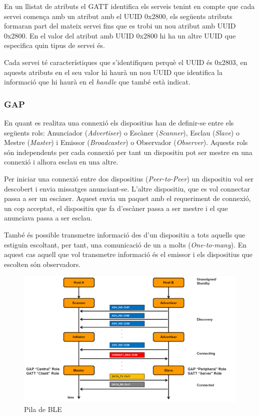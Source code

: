 En un llistat de atributs el GATT identifica els serveis tenint en compte que cada servei comença amb un atribut amb el UUID 0x2800, els següents atributs formaran part del mateix servei fins que es trobi un nou atribut amb UUID 0x2800. En el valor del atribut amb UUID 0x2800 hi ha un altre UUID que especifica quin tipus de servei és.

Cada servei té característiques que s'identifiquen perquè el UUID és 0x2803, en aquests atributs en el seu valor hi haurà un nou UUID que identifica la informació que hi haurà en el \textit{handle} que també està indicat.


\subsubsection{GAP}
En quant es realitza una connexió els dispositius han de definir-se entre els següents rols: Anunciador (\textit{Advertiser}) o Escàner (\textit{Scanner}), Esclau (\textit{Slave}) o Mestre (\textit{Master}) i Emissor (\textit{Broadcaster}) o Observador (\textit{Observer}).
Aquests rols són independents per cada connexió per tant un dispositiu pot ser mestre en una connexió i alhora esclau en una altre.

Per iniciar una connexió entre dos dispositius (\textit{Peer-to-Peer}) un dispositiu vol ser descobert i envia missatges anunciant-se. L'altre dispositiu, que es vol connectar passa a ser un escàner. Aquest envia un paquet amb el requeriment de connexió, un cop acceptat, el dispositiu que fa d'escàner passa a ser mestre i el que anunciava passa a ser esclau.

També és possible transmetre informació des d'un dispositiu a tots aquells que estiguin escoltant, per tant, una comunicació de un a molts (\textit{One-to-many}). En aquest cas aquell que vol transmetre informació és el emissor i els dispositius que escolten són observadors.

\begin{figure}[h]
	\begin{center}
		\includegraphics[width=1\textwidth]{./images/rols_unicast.png}
		\caption{Pila de BLE \cite{ble_stack}}
		\label{ble_stack}
	\end{center}
\end{figure}

